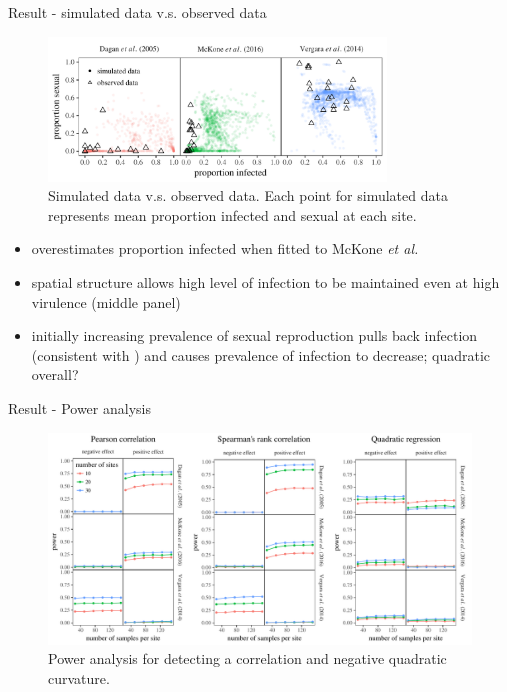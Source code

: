 \documentclass{beamer}
\newcommand{\etal}{\emph{et al.}}
\begin{document}
\begin{frame}{Result - simulated data v.s. observed data}
\vspace{-1em}
\begin{figure}
\includegraphics[width=0.8\textwidth]{../fig/simulated_data.pdf}
\vspace{-1em}
\caption{Simulated data v.s. observed data. Each point for simulated data represents mean proportion infected and sexual at each site.}
\vspace{-1em}
\end{figure}
\begin{itemize}
    \item overestimates proportion infected when fitted to McKone \etal\ \cite{mckone2016fine}
    \item spatial structure allows high level of infection to be maintained even at high virulence (middle panel)
    \item initially increasing prevalence of sexual reproduction pulls back infection (consistent with \cite{lively2001trematode}) and causes prevalence of infection to decrease; quadratic overall?
\end{itemize}
\end{frame}

\begin{frame}{Result - Power analysis}
\begin{figure}
\includegraphics[width=1\textwidth]{../fig/power.pdf}
\caption{Power analysis for detecting a correlation and negative quadratic curvature.}
\end{figure}
\end{frame}
\end{document}
